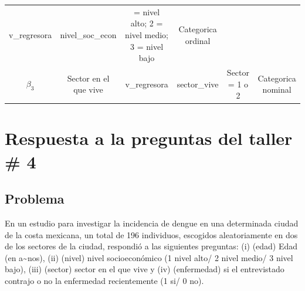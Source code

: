 \documentclass[
]{article}
\begin{document}
\begin{longtable}[]{@{}cccccc@{}}
\begin{minipage}[t]{0.17\columnwidth}
v\_regresora\strut
\end{minipage} & \begin{minipage}[t]{0.18\columnwidth}\centering
nivel\_soc\_econ\strut
\end{minipage} & \begin{minipage}[t]{0.15\columnwidth}\centering
1 = nivel alto; 2 = nivel medio; 3 = nivel bajo\strut
\end{minipage} & \begin{minipage}[t]{0.13\columnwidth}\centering
Categorica ordinal\strut
\end{minipage}\tabularnewline
\begin{minipage}[t]{0.07\columnwidth}\centering
\(\beta_3\)\strut
\end{minipage} & \begin{minipage}[t]{0.13\columnwidth}\centering
Sector en el que vive\strut
\end{minipage} & \begin{minipage}[t]{0.17\columnwidth}\centering
v\_regresora\strut
\end{minipage} & \begin{minipage}[t]{0.18\columnwidth}\centering
sector\_vive\strut
\end{minipage} & \begin{minipage}[t]{0.15\columnwidth}\centering
Sector = 1 o 2\strut
\end{minipage} & \begin{minipage}[t]{0.13\columnwidth}\centering
Categorica nominal\strut
\end{minipage}\tabularnewline
\bottomrule
\end{longtable}

\hypertarget{respuesta-a-la-preguntas-del-taller-4}{%
\section{Respuesta a la preguntas del taller \#
4}\label{respuesta-a-la-preguntas-del-taller-4}}

\hypertarget{problema}{%
\subsection{Problema}\label{problema}}

En un estudio para investigar la incidencia de dengue en una determinada
ciudad de la costa mexicana, un total de 196 individuos, escogidos
aleatoriamente en dos de los sectores de la ciudad, respondió a las
siguientes preguntas: (i) (edad) Edad (en a\textasciitilde nos), (ii)
(nivel) nivel socioeconómico (1 nivel alto/ 2 nivel medio/ 3 nivel
bajo), (iii) (sector) sector en el que vive y (iv) (enfermedad) si el
entrevistado contrajo o no la enfermedad recientemente (1 si/ 0 no).
\end{document}
